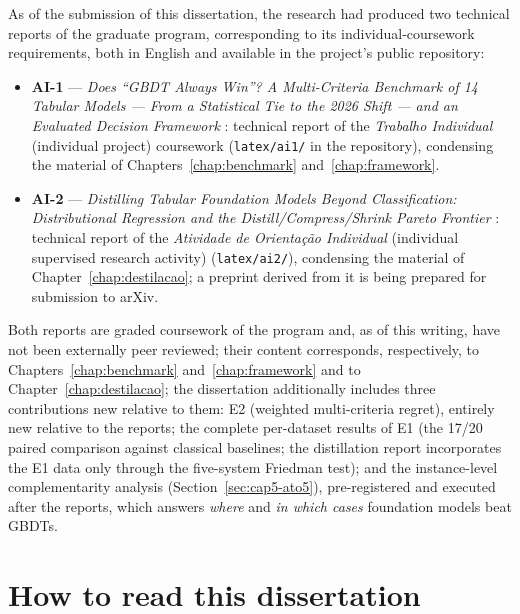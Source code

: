 As of the submission of this dissertation, the research had produced
two technical reports of the graduate program, corresponding to its
individual-coursework requirements, both in English and available in
the project's public repository:

\begin{itemize}
  \item \textbf{AI-1} --- \emph{Does ``GBDT Always Win''? A
    Multi-Criteria Benchmark of 14 Tabular Models --- From a
    Statistical Tie to the 2026 Shift --- and an Evaluated Decision
    Framework} \citep{companion2026}: technical report of the
    \emph{Trabalho Individual} (individual project) coursework
    (\texttt{latex/ai1/} in the repository), condensing the material of
    Chapters~\ref{chap:benchmark} and~\ref{chap:framework}.
  \item \textbf{AI-2} --- \emph{Distilling Tabular Foundation Models
    Beyond Classification: Distributional Regression and the
    Distill/Compress/Shrink Pareto Frontier}
    \citep{companion-ai2-2026}: technical report of the
    \emph{Atividade de Orientação Individual} (individual supervised
    research activity) (\texttt{latex/ai2/}), condensing the
    material of Chapter~\ref{chap:destilacao}; a preprint derived
    from it is being prepared for submission to arXiv.
\end{itemize}

Both reports are graded coursework of the program and, as of this
writing, have not been externally peer reviewed; their content corresponds, respectively,
to Chapters~\ref{chap:benchmark} and~\ref{chap:framework} and to
Chapter~\ref{chap:destilacao}; the dissertation additionally
includes three
contributions new relative to them: E2 (weighted multi-criteria
regret), entirely new relative to the reports; the complete
per-dataset results of E1 (the 17/20 paired comparison against
classical baselines; the distillation report incorporates the E1
data only through the five-system Friedman test); and the
instance-level complementarity analysis
(Section~\ref{sec:cap5-ato5}), pre-registered and executed after the
reports, which answers \emph{where} and \emph{in which cases}
foundation models beat GBDTs.

\section{How to read this dissertation}
\label{sec:intro-comoler}

